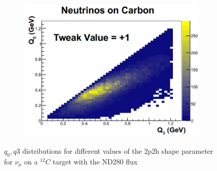 \begin{figure}[h]
\begin{subfigure}[t]{0.32\textwidth}
	\end{subfigure}
	\begin{subfigure}[t]{0.32\textwidth}
		\includegraphics[width=\textwidth, trim={0mm 0mm 0mm 13mm}, clip,page=1]{figures/niwg/neutrino_carbon_p3}
	\end{subfigure}
\caption{$q_0,q3$ distributions for different values of the 2p2h shape parameter for $\nu_\mu$ on a $^{12}C$ target with the ND280 flux}
\label{fig:2p2h_shape_q0q3}
\end{figure}


